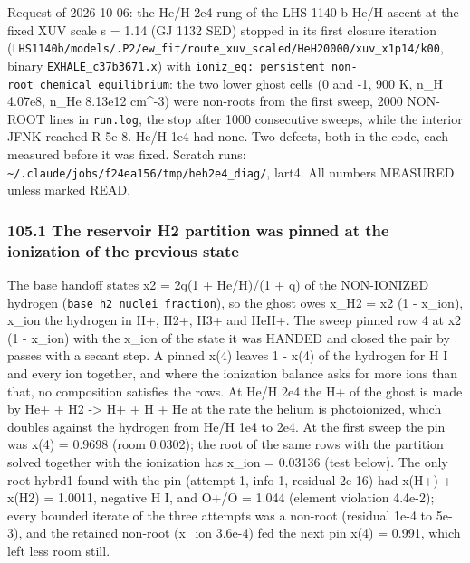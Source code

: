 \documentclass[english,a4paper]{my_memo}
\begin{document}
Request of 2026-10-06: the He/H 2e4 rung of the LHS 1140 b He/H ascent at
the fixed XUV scale s = 1.14 (GJ 1132 SED) stopped in its first closure
iteration (\texttt{LHS1140b/models/.P2/ew\_fit/route\_xuv\_scaled/HeH20000/xuv\_x1p14/k00},
binary \texttt{EXHALE\_c37b3671.x}) with \texttt{ioniz\_eq:\ persistent\ non-root\ chemical\ equilibrium}: the two lower ghost cells (0 and -1, 900 K, n\_H 4.07e8,
n\_He 8.13e12 cm\^{}-3) were non-roots from the first sweep, 2000 NON-ROOT lines
in \texttt{run.log}, the stop after 1000 consecutive sweeps, while the interior JFNK
reached \textbar\textbar R\textbar\textbar{} 5e-8. He/H 1e4 had none. Two defects, both in the code, each
measured before it was fixed. Scratch runs: \texttt{\textasciitilde{}/.claude/jobs/f24ea156/tmp/heh2e4\_diag/},
lart4. All numbers MEASURED unless marked READ.

\subsubsection{105.1 The reservoir H2 partition was pinned at the ionization of the previous state}\label{1051-the-reservoir-h2-partition-was-pinned-at-the-ionization-of-the-previous-state}

The base handoff states x2 = 2q(1 + He/H)/(1 + q) of the NON-IONIZED
hydrogen (\texttt{base\_h2\_nuclei\_fraction}), so the ghost owes
x\_H2 = x2 (1 - x\_ion), x\_ion the hydrogen in H+, H2+, H3+ and HeH+. The sweep
pinned row 4 at x2 (1 - x\_ion) with the x\_ion of the state it was HANDED and
closed the pair by passes with a secant step. A pinned x(4) leaves 1 - x(4)
of the hydrogen for H I and every ion together, and where the ionization
balance asks for more ions than that, no composition satisfies the rows. At
He/H 2e4 the H+ of the ghost is made by He+ + H2 -\textgreater{} H+ + H + He at the rate
the helium is photoionized, which doubles against the hydrogen from He/H 1e4
to 2e4. At the first sweep the pin was x(4) = 0.9698 (room 0.0302); the root
of the same rows with the partition solved together with the ionization has
x\_ion = 0.03136 (test below). The only root hybrd1 found with the pin
(attempt 1, info 1, residual 2e-16) had x(H+) + x(H2) = 1.0011, negative
H I, and O+/O = 1.044 (element violation 4.4e-2); every bounded iterate of
the three attempts was a non-root (residual 1e-4 to 5e-3), and the retained
non-root (x\_ion 3.6e-4) fed the next pin x(4) = 0.991, which left less room
still.
\end{document}
